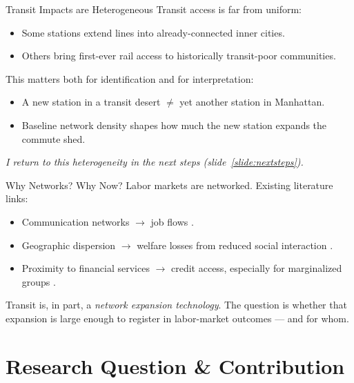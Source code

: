 \documentclass{beamer}
\begin{document}
\begin{frame}{Transit Impacts are Heterogeneous}
\small
Transit access is far from uniform:

\bigskip
\begin{itemize}
  \item Some stations extend lines into already-connected inner cities.
  \item Others bring first-ever rail access to historically transit-poor communities.
\end{itemize}

\bigskip
This matters both for identification and for interpretation:
\begin{itemize}
  \item A new station in a transit desert $\neq$ yet another station in Manhattan.
  \item Baseline network density shapes how much the new station expands the commute shed.
\end{itemize}

\bigskip
\textit{I return to this heterogeneity in the next steps
(slide~\ref{slide:nextsteps}).}
\end{frame}

\begin{frame}{Why Networks? Why Now?}
\small
Labor markets are networked. Existing literature links:

\bigskip
\begin{itemize}
  \item Communication networks $\to$ job flows \parencite{patacchini_referral_fx}.
  \item Geographic dispersion $\to$ welfare losses from reduced social interaction
        \parencite{kimSpatialInteractions2023}.
  \item Proximity to financial services $\to$ credit access, especially for marginalized
        groups \parencite{Relihan2017BranchesIL}.
\end{itemize}

\bigskip
Transit is, in part, a \emph{network expansion technology}. The question is whether
that expansion is large enough to register in labor-market outcomes --- and for whom.
\end{frame}

\section{Research Question \& Contribution}
\end{document}
